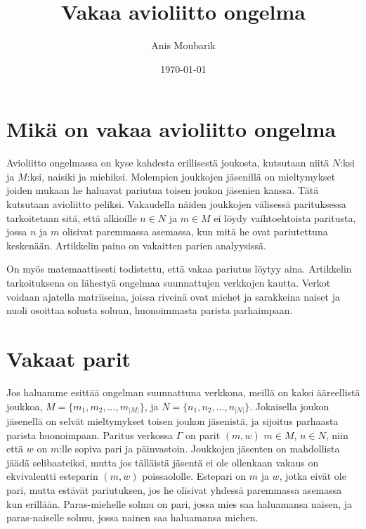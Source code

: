\documentclass[finnish]{tktltiki2}
\title{Vakaa avioliitto ongelma}
\author{Anis Moubarik}
\date{\today}
\theoremstyle{definition}
\theoremstyle{remark}
\begin{document}

\maketitle        %
\makeabstract     %

\newpage          %



\section{Mikä on vakaa avioliitto ongelma}


Avioliitto ongelmassa on kyse kahdesta erillisestä joukosta, kutsutaan niitä $N$:ksi ja $M$:ksi, naisiki ja miehiksi. Molempien joukkojen jäsenillä on mieltymykset joiden mukaan he haluavat pariutua toisen joukon jäsenien kanssa. Tätä kutsutaan avioliitto peliksi.
Vakaudella näiden joukkojen välisessä parituksessa tarkoitetaan sitä, että alkioille $n \in N$ ja $m \in M$ ei löydy vaihtoehtoista paritusta, jossa $n$ ja $m$ olisivat paremmassa asemassa, kun mitä he ovat pariutettuna keskenään. Artikkelin paino on vakaitten parien analyysissä.

On myös matemaattisesti todistettu, että vakaa pariutus löytyy aina. Artikkelin tarkoituksena on lähestyä ongelmaa suunnattujen verkkojen kautta. Verkot voidaan ajatella matriiseina, joissa riveinä ovat miehet ja sarakkeina naiset ja nuoli osoittaa solusta soluun, huonoimmasta parista parhaimpaan.


\section{Vakaat parit}
Jos haluamme esittää ongelman suunnattuna verkkona, meillä on kaksi ääreellistä joukkoa, 
$M = \{m_{1}, m_{2},..., m_{|M|}\}$, ja $N = \{n_{1}, n_{2},...,n_{|N|}\}$. Jokaisella joukon jäsenellä on selvät mieltymykset toisen joukon jäsenistä, ja sijoitus parhaasta parista huonoimpaan. Paritus verkossa $\Gamma$ on parit $(m, w)$ $m \in M$, $n \in N$, niin että $w$ on $m$:lle sopiva pari ja päinvastoin. Joukkojen jäsenten on mahdollista jäädä selibaateiksi, mutta jos tälläistä jäsentä ei ole ollenkaan vakaus on ekvivalentti esteparin $(m, w)$ poissaololle.
Estepari on $m$ ja $w$, jotka eivät ole pari, mutta estävät pariutuksen, jos he olisivat yhdessä paremmassa asemassa kun erillään.
Paras-miehelle solmu on pari, jossa mies saa haluamansa naisen, ja paras-naiselle solmu, jossa nainen saa haluamansa miehen.
\end{document}
